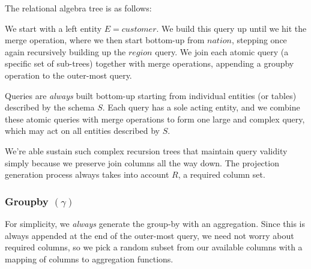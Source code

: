\documentclass[10pt, twocolumn]{article}
\begin{document}
\noindent
The relational algebra tree is as follows:

\spacing
{}

\spacing
\noindent
We start with a left entity $E = customer$. We build this query up until we hit the merge operation, where we then start bottom-up from $nation$, stepping once again recursively building up the $region$ query. We join each atomic query (a specific set of sub-trees) together with merge operations, appending a groupby operation to the outer-most query.

\spacing
\noindent
Queries are \textit{always} built bottom-up starting from individual entities (or tables) described by the schema $S$. Each query has a sole acting entity, and we combine these atomic queries with merge operations to form one large and complex query, which may act on all entities described by $S$.

\spacing
\noindent
We're able sustain such complex recursion trees that maintain query validity simply because we preserve join columns all the way down. The projection generation process always takes into account $R$, a required column set.

\subsubsection*{Groupby $(\gamma)$}

For simplicity, we \textit{always} generate the group-by with an aggregation. Since this is always appended at the end of the outer-most query, we need not worry about required columns, so we pick a random subset from our available columns with a mapping of columns to aggregation functions.
\end{document}
